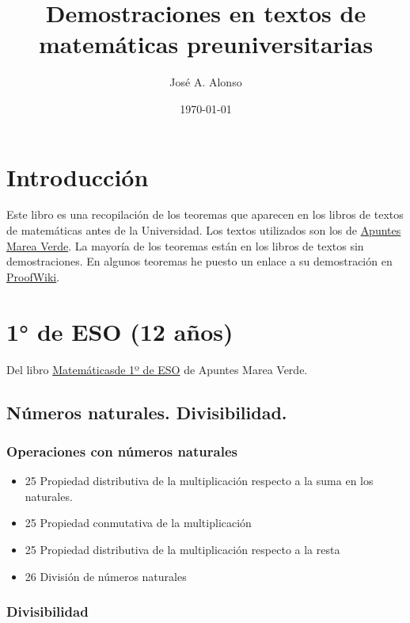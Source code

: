 \documentclass[a4paper,12pt,twoside]{book}
\author{José A. Alonso}
\date{\today}
\title{Demostraciones en textos de matemáticas preuniversitarias}
\theoremstyle{teorema}
\theoremstyle{remark}
\begin{document}
\maketitle
\tableofcontents

\chapter*{Introducción}

Este libro es una recopilación de los teoremas que aparecen en los
libros de textos de matemáticas antes de la Universidad. Los textos
utilizados son los de \href{http://www.apuntesmareaverde.org.es/}{Apuntes Marea Verde}. La mayoría de los teoremas
están en los libros de textos sin demostraciones. En algunos teoremas he
puesto un enlace a su demostración en \href{https://proofwiki.org}{ProofWiki}.

\chapter{1° de ESO (12 años)}
\label{sec:org2e02aa1}

Del libro \href{http://www.apuntesmareaverde.org.es/grupos/mat/LOMLOE/1ESO/1ESO.pdf}{Matemáticasde 1º de ESO} de Apuntes Marea Verde.

\section{Números naturales. Divisibilidad.}
\label{sec:org07c9f04}

\subsection{Operaciones con números naturales}
\label{sec:orgd66bc4d}

\begin{itemize}
\item 25 Propiedad distributiva de la multiplicación respecto a la suma en los naturales.

\item 25 Propiedad conmutativa de la multiplicación

\item 25 Propiedad distributiva de la multiplicación respecto a la resta

\item 26 División de números naturales
\end{itemize}

\subsection{Divisibilidad}
\label{sec:orgaf52ecb}
\end{document}
